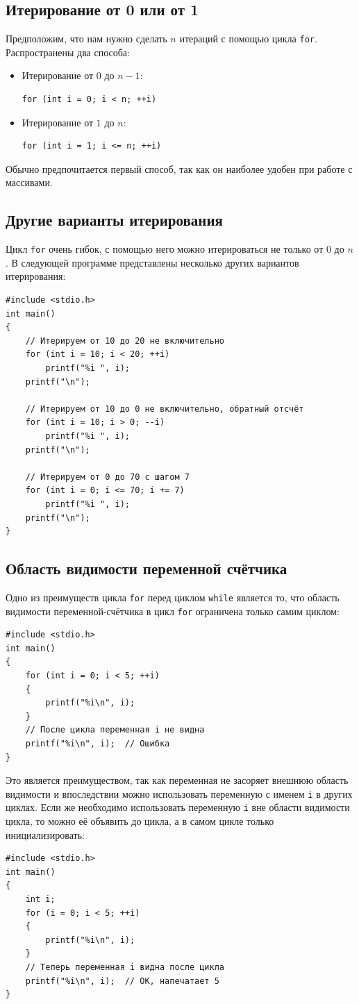 \documentclass{article}
\begin{document}
\subsection*{Итерирование от 0 или от 1}
Предположим, что нам нужно сделать $n$ итераций с помощью цикла \texttt{for}. Распространены два способа:
\begin{itemize}
\item Итерирование от $0$ до $n - 1$:
\begin{lstlisting}
for (int i = 0; i < n; ++i)
\end{lstlisting}

\item Итерирование от $1$ до $n$:
\begin{lstlisting}
for (int i = 1; i <= n; ++i)
\end{lstlisting}
\end{itemize}
Обычно предпочитается первый способ, так как он наиболее удобен при работе с массивами.

\subsection*{Другие варианты итерирования}
Цикл \texttt{for} очень гибок, с помощью него можно итерироваться не только от $0$ до $n$. В следующей программе представлены несколько других вариантов итерирования:
\begin{lstlisting}
#include <stdio.h>
int main()
{
	// Итерируем от 10 до 20 не включительно
	for (int i = 10; i < 20; ++i)
		printf("%i ", i);
	printf("\n");
	
	// Итерируем от 10 до 0 не включительно, обратный отсчёт
	for (int i = 10; i > 0; --i)
		printf("%i ", i);
	printf("\n");	
	
	// Итерируем от 0 до 70 с шагом 7
	for (int i = 0; i <= 70; i += 7)
		printf("%i ", i);
	printf("\n");	
}
\end{lstlisting}


\subsection*{Область видимости переменной счётчика}
Одно из преимуществ цикла \texttt{for} перед циклом \texttt{while} является то, что область видимости переменной-счётчика в цикл \texttt{for} ограничена только самим циклом:
\begin{lstlisting}
#include <stdio.h>
int main()
{
	for (int i = 0; i < 5; ++i)
	{
		printf("%i\n", i);
	}
	// После цикла переменная i не видна
	printf("%i\n", i);  // Ошибка
}
\end{lstlisting}
Это является преимуществом, так как переменная не засоряет внешнюю область видимости и впоследствии можно использовать переменную с именем \texttt{i} в других циклах. Если же необходимо использовать переменную \texttt{i} вне области видимости цикла, то можно её объявить до цикла, а в самом цикле только инициализировать:
\begin{lstlisting}
#include <stdio.h>
int main()
{
	int i;
	for (i = 0; i < 5; ++i)
	{
		printf("%i\n", i);
	}
	// Теперь переменная i видна после цикла
	printf("%i\n", i);  // ОК, напечатает 5
}	
\end{lstlisting}
\end{document}
